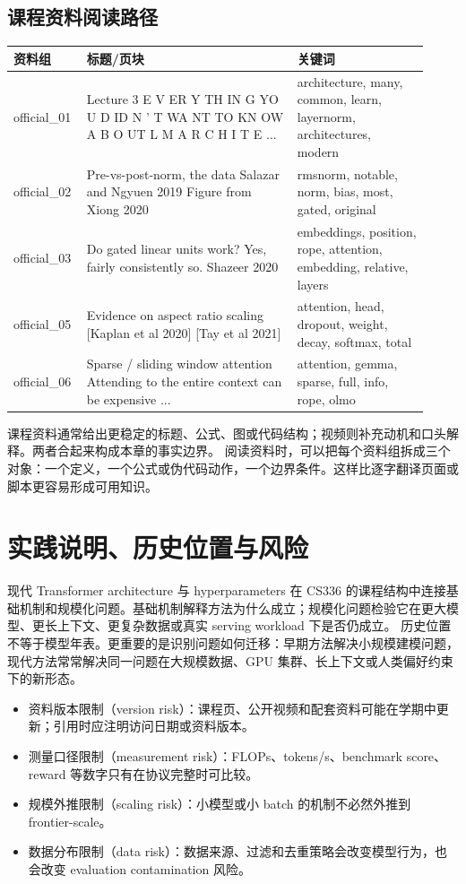 \documentclass[a4paper]{article}
\begin{document}
\subsection{课程资料阅读路径}
\begin{longtable}{p{0.14\linewidth}p{0.48\linewidth}p{0.30\linewidth}}
\toprule
\textbf{资料组} & \textbf{标题/页块} & \textbf{关键词}\\
\midrule
official\_01 & Lecture 3 E V ER Y TH IN G YO U D ID N ’ T WA NT TO KN OW A B O UT L M A R C H I T E ... & architecture, many, common, learn, layernorm, architectures, modern\\
official\_02 & Pre-vs-post-norm, the data Salazar and Ngyuen 2019 Figure from Xiong 2020 & rmsnorm, notable, norm, bias, most, gated, original\\
official\_03 & Do gated linear units work? Yes, fairly consistently so. Shazeer 2020 & embeddings, position, rope, attention, embedding, relative, layers\\
official\_05 & Evidence on aspect ratio scaling [Kaplan et al 2020] [Tay et al 2021] & attention, head, dropout, weight, decay, softmax, total\\
official\_06 & Sparse / sliding window attention Attending to the entire context can be expensive ... & attention, gemma, sparse, full, info, rope, olmo\\
\bottomrule
\end{longtable}
课程资料通常给出更稳定的标题、公式、图或代码结构；视频则补充动机和口头解释。两者合起来构成本章的事实边界。
阅读资料时，可以把每个资料组拆成三个对象：一个定义，一个公式或伪代码动作，一个边界条件。这样比逐字翻译页面或脚本更容易形成可用知识。
\section{实践说明、历史位置与风险}
现代 Transformer architecture 与 hyperparameters 在 CS336 的课程结构中连接基础机制和规模化问题。基础机制解释方法为什么成立；规模化问题检验它在更大模型、更长上下文、更复杂数据或真实 serving workload 下是否仍成立。
历史位置不等于模型年表。更重要的是识别问题如何迁移：早期方法解决小规模建模问题，现代方法常常解决同一问题在大规模数据、GPU 集群、长上下文或人类偏好约束下的新形态。
\begin{itemize}
\item 资料版本限制（version risk）：课程页、公开视频和配套资料可能在学期中更新；引用时应注明访问日期或资料版本。
\item 测量口径限制（measurement risk）：FLOPs、tokens/s、benchmark score、reward 等数字只有在协议完整时可比较。
\item 规模外推限制（scaling risk）：小模型或小 batch 的机制不必然外推到 frontier-scale。
\item 数据分布限制（data risk）：数据来源、过滤和去重策略会改变模型行为，也会改变 evaluation contamination 风险。
\end{itemize}
\end{document}
